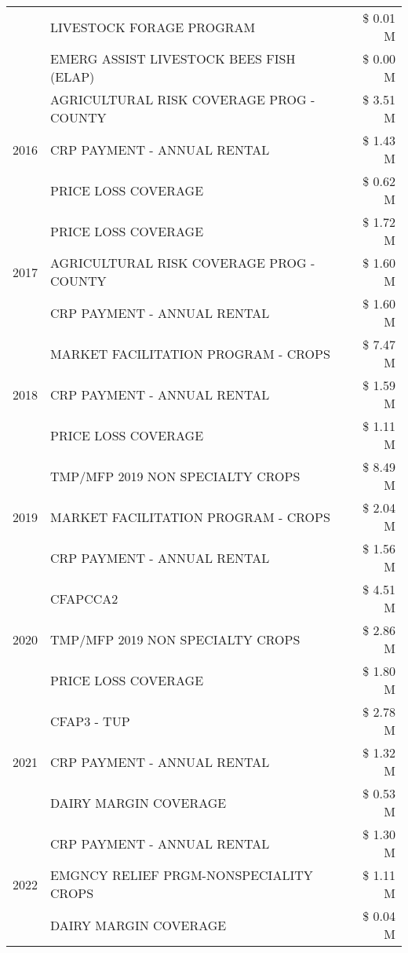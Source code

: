 \begin{tabular}{llr}
 & LIVESTOCK FORAGE PROGRAM & \$ 0.01 M \\
 & EMERG ASSIST LIVESTOCK BEES FISH (ELAP) & \$ 0.00 M \\
\cline{1-3}
\multirow[t]{3}{*}{2016} & AGRICULTURAL RISK COVERAGE PROG - COUNTY & \$ 3.51 M \\
 & CRP PAYMENT - ANNUAL RENTAL & \$ 1.43 M \\
 & PRICE LOSS COVERAGE & \$ 0.62 M \\
\cline{1-3}
\multirow[t]{3}{*}{2017} & PRICE LOSS COVERAGE & \$ 1.72 M \\
 & AGRICULTURAL RISK COVERAGE PROG - COUNTY & \$ 1.60 M \\
 & CRP PAYMENT - ANNUAL RENTAL & \$ 1.60 M \\
\cline{1-3}
\multirow[t]{3}{*}{2018} & MARKET FACILITATION PROGRAM - CROPS & \$ 7.47 M \\
 & CRP PAYMENT - ANNUAL RENTAL & \$ 1.59 M \\
 & PRICE LOSS COVERAGE & \$ 1.11 M \\
\cline{1-3}
\multirow[t]{3}{*}{2019} & TMP/MFP 2019 NON SPECIALTY CROPS & \$ 8.49 M \\
 & MARKET FACILITATION PROGRAM - CROPS & \$ 2.04 M \\
 & CRP PAYMENT - ANNUAL RENTAL & \$ 1.56 M \\
\cline{1-3}
\multirow[t]{3}{*}{2020} & CFAPCCA2 & \$ 4.51 M \\
 & TMP/MFP 2019 NON SPECIALTY CROPS & \$ 2.86 M \\
 & PRICE LOSS COVERAGE & \$ 1.80 M \\
\cline{1-3}
\multirow[t]{3}{*}{2021} & CFAP3 - TUP & \$ 2.78 M \\
 & CRP PAYMENT - ANNUAL RENTAL & \$ 1.32 M \\
 & DAIRY MARGIN COVERAGE & \$ 0.53 M \\
\cline{1-3}
\multirow[t]{3}{*}{2022} & CRP PAYMENT - ANNUAL RENTAL & \$ 1.30 M \\
 & EMGNCY RELIEF PRGM-NONSPECIALITY CROPS & \$ 1.11 M \\
 & DAIRY MARGIN COVERAGE & \$ 0.04 M \\
\cline{1-3}
\bottomrule
\end{tabular}
